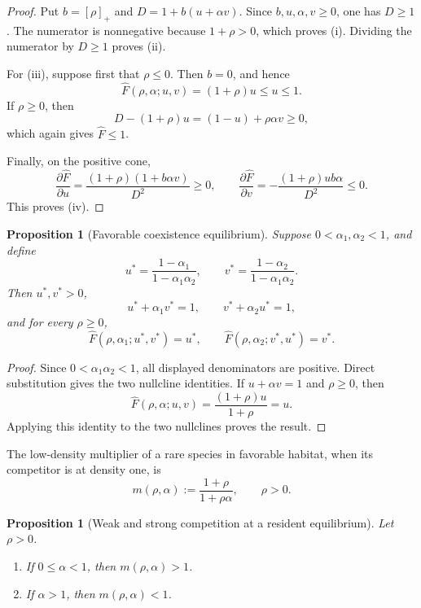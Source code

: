\documentclass[11pt]{article}
\newtheorem{proposition}[theorem]{Proposition}
\theoremstyle{definition}
\newcommand{\Fhat}{\widehat F}
\begin{document}
\begin{proof}
Put \(b=[\rho]_+\) and \(D=1+b(u+\alpha v)\).  Since
\(b,u,\alpha,v\geq0\), one has \(D\geq1\).  The numerator is nonnegative
because \(1+\rho>0\), which proves (i).  Dividing the numerator by
\(D\geq1\) proves (ii).

For (iii), suppose first that \(\rho\leq0\).  Then \(b=0\), and hence
\[
  \Fhat(\rho,\alpha;u,v)=(1+\rho)u\leq u\leq1.
\]
If \(\rho\geq0\), then
\[
  D-(1+\rho)u=(1-u)+\rho\alpha v\geq0,
\]
which again gives \(\Fhat\leq1\).

Finally, on the positive cone,
\[
  \frac{\partial\Fhat}{\partial u}
  =
  \frac{(1+\rho)(1+b\alpha v)}{D^2}\geq0,
  \qquad
  \frac{\partial\Fhat}{\partial v}
  =
  -\frac{(1+\rho)ub\alpha}{D^2}\leq0.
\]
This proves (iv).
\end{proof}

\begin{proposition}[Favorable coexistence equilibrium]
\label{prop:equilibrium}
Suppose \(0<\alpha_1,\alpha_2<1\), and define
\[
  u^*=\frac{1-\alpha_1}{1-\alpha_1\alpha_2},
  \qquad
  v^*=\frac{1-\alpha_2}{1-\alpha_1\alpha_2}.
\]
Then \(u^*,v^*>0\),
\[
  u^*+\alpha_1v^*=1,
  \qquad
  v^*+\alpha_2u^*=1,
\]
and for every \(\rho\geq0\),
\[
  \Fhat(\rho,\alpha_1;u^*,v^*)=u^*,
  \qquad
  \Fhat(\rho,\alpha_2;v^*,u^*)=v^*.
\]
\end{proposition}

\begin{proof}
Since \(0<\alpha_1\alpha_2<1\), all displayed denominators are positive.
Direct substitution gives the two nullcline identities.  If
\(u+\alpha v=1\) and \(\rho\geq0\), then
\[
  \Fhat(\rho,\alpha;u,v)
  =\frac{(1+\rho)u}{1+\rho}=u.
\]
Applying this identity to the two nullclines proves the result.
\end{proof}

The low-density multiplier of a rare species in favorable habitat, when its
competitor is at density one, is
\begin{equation}\label{eq:rare-multiplier}
  m(\rho,\alpha):=\frac{1+\rho}{1+\rho\alpha},
  \qquad \rho>0.
\end{equation}

\begin{proposition}[Weak and strong competition at a resident equilibrium]
\label{prop:invasion-multiplier}
Let \(\rho>0\).
\begin{enumerate}[label=(\roman*)]
  \item If \(0\leq\alpha<1\), then \(m(\rho,\alpha)>1\).
  \item If \(\alpha>1\), then \(m(\rho,\alpha)<1\).
\end{enumerate}
\end{proposition}
\end{document}
